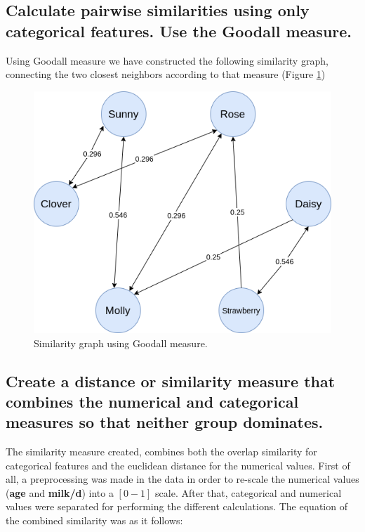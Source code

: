 \documentclass[12pt]{article}
\begin{document}
\subsection{Calculate pairwise similarities using only categorical features. Use
the Goodall measure.}

Using Goodall measure we have constructed the following similarity graph, connecting the two closest neighbors according to that measure (Figure \ref{fig:goodall-graph})

\begin{figure}[h]
    \centering
    \includegraphics[scale=0.3]{assignment-1/plots/task-4/task-4-a-3.png}
    \caption{Similarity graph using Goodall measure.}
    \label{fig:goodall-graph}
\end{figure}

\subsection{Create a distance or similarity measure that combines the numerical and categorical measures so that neither group dominates.}

The similarity measure created, combines both the overlap similarity for categorical features and the euclidean distance for the numerical values. First of all, a preprocessing was made in the data in order to re-scale the numerical values (\textbf{age} and \textbf{milk/d}) into a $[0 - 1]$ scale. After that, categorical and numerical values were separated for performing the different calculations. The equation of the combined similarity was as it follows:
\end{document}
